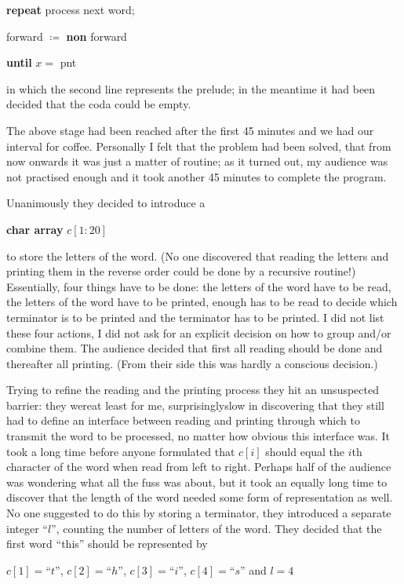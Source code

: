 \quad \textbf{repeat} process next word;

\quad \quad forward $\coloneq$ \textbf{non} forward

\quad \textbf{until} $x =$ pnt

\noindent
in which the second line represents the prelude; in the meantime it had been decided that the coda could be empty.

The above stage had been reached after the first 45 minutes and we had our interval for coffee. Personally I felt that the problem had been solved, that from now onwards it was just a matter of routine; as it turned out, my audience was not practised enough and it took another 45 minutes to complete the program.

Unanimously they decided to introduce a

\quad \textbf{char array} $c[1:20]$

\noindent
to store the letters of the word. (No one discovered that reading the letters and printing them in the reverse order could be done by a recursive routine!) Essentially, four things have to be done: the letters of the word have to be read, the letters of the word have to be printed, enough has to be read to decide which terminator is to be printed and the terminator has to be printed. I did not list these four actions, I did not ask for an explicit decision on how to group and/or combine them. The audience decided that first all reading should be done and thereafter all printing. (From their side this was hardly a conscious decision.)

Trying to refine the reading and the printing process they hit an unsuspected barrier: they were\textemdash{}at least for me, surprisingly\textemdash{}slow in discovering that they still had to define an interface between reading and printing through which to transmit the word to be processed, no matter how obvious this interface was. It took a long time before anyone formulated that $c[i]$ should equal the $i$th character of the word when read from left to right. Perhaps half of the audience was wondering what all the fuss was about, but it took an equally long time to discover that the length of the word needed some form of representation as well. No one suggested to do this by storing a terminator, they introduced a separate integer ``$l$'', counting the number of letters of the word. They decided that the first word ``this'' should be represented by

\quad $c[1] = $``$t$'', $c[2] = $``$h$'', $c[3] = $``$i$'', $c[4] = $``$s$'' and $l = 4$

